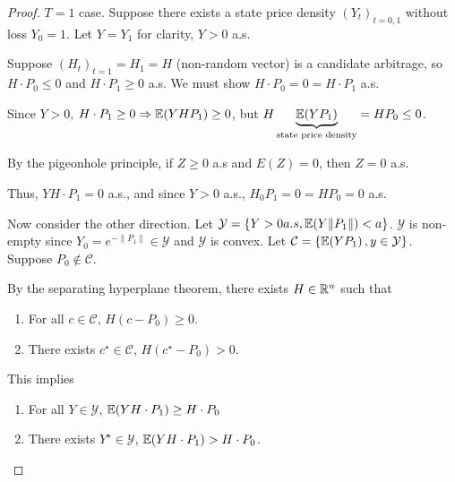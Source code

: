 \begin{proof}
  $T = 1$ case.  Suppose there exists a state price density
  $(Y_{t})_{t = 0, 1}$ without loss $Y_{0} = 1$.  Let $Y = Y_{1}$ for
  clarity, $Y > 0$ a.s.

  Suppose $(H_{t})_{t = 1} = H_{1} = H$ (non-random vector) is a
  candidate arbitrage, so $H \cdot P_{0} \leq 0$ and $H \cdot P_{1}
  \geq 0$ a.s.  We must show $H \cdot P_{0} = 0 = H \cdot P_{1}$ a.s.

  Since $Y > 0$, $H \cdot P_{1} \geq 0 \Rightarrow \E{Y H P_{1}} \geq
    0$, but $H \underbrace{\E{Y P_{1}}}_{\text{state price density}} =
    H P_{0} \leq 0$.

  By the pigeonhole principle, if $Z \geq 0$ a.s and $E(Z) = 0$, then
  $Z = 0$ a.s.

  Thus, $Y H \cdot P_{1} = 0$ a.s., and since $Y > 0$ a.s., $H_{0}
  P_{1} = 0 = H P_{0} = 0$ a.s.

  Now consider the other direction.  Let $\mathcal{Y} = \{ Y > 0 a.s,
  \E{Y \| P_{1} \|} < a \}$.  $\mathcal{Y}$ is non-empty since $Y_{0}
  = e^{-\| P_{1} \|} \in \mathcal{Y}$ and $\mathcal{Y}$ is convex.
  Let $\mathcal{C} = \{ \E{YP_{1}}, y \in \mathcal{Y} \}$.  Suppose
  $P_{0} \notin \mathcal{C}$.

  By the separating hyperplane theorem, there exists $H \in \mathbb{R}^{n}$ such
  that
  \begin{enumerate}
  \item For all $c \in \mathcal{C}$, $H(c - P_{0}) \geq 0$.
  \item There exists $c^{\star} \in \mathcal{C}$, $H(c^{\star} - P_{0}) > 0$.
  \end{enumerate}

  This implies
  \begin{enumerate}
  \item For all $Y \in \mathcal{Y}$, $\E{YH \cdot P_{1}} \geq H \cdot
    P_{0}$
  \item There exists $Y^{\star} \in \mathcal{Y}$, $\E{Y H \cdot P_{1}} > H
    \cdot P_{0}$.
  \end{enumerate}
\end{proof}

